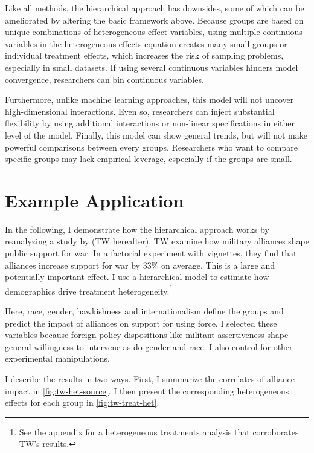 \documentclass[12pt]{article}
\begin{document}
Like all methods, the hierarchical approach has downsides, some of which can be ameliorated by altering the basic framework above. 
Because groups are based on unique combinations of heterogeneous effect variables, using multiple continuous variables in the heterogeneous effects equation creates many small groups or individual treatment effects, which increases the risk of sampling problems, especially in small datasets. 
If using several continuous variables hinders model convergence, researchers can bin continuous variables.


Furthermore, unlike machine learning approaches, this model will not uncover high-dimensional interactions. 
Even so, researchers can inject substantial flexibility by using additional interactions or non-linear specifications in either level of the model. 
Finally, this model can show general trends, but will not make powerful comparisons between every groups. 
Researchers who want to compare specific groups may lack empirical leverage, especially if the groups are small.



\section{Example Application} 


In the following, I demonstrate how the hierarchical approach works by reanalyzing a study by \citet{TomzWeeks2021} (TW hereafter). 
TW examine how military alliances shape public support for war.
In a factorial experiment with vignettes, they find that alliances increase support for war by 33\% on average. 
This is a large and potentially important effect. 
I use a hierarchical model to estimate how demographics drive treatment heterogeneity.\footnote{See the appendix for a heterogeneous treatments analysis that corroborates TW's results.}


Here, race, gender, hawkishness and internationalism define the groups and predict the impact of alliances on support for using force. 
I selected these variables because foreign policy dispositions like militant assertiveness shape general willingness to intervene \citep{Kertzeretal2014} as do gender \citep{Barnhartetal2020} and race. 
I also control for other experimental manipulations. 


I describe the results in two ways. 
First, I summarize the correlates of alliance impact in \autoref{fig:tw-het-source}.
I then present the corresponding heterogeneous effects for each group in \autoref{fig:tw-treat-het}.
\end{document}
